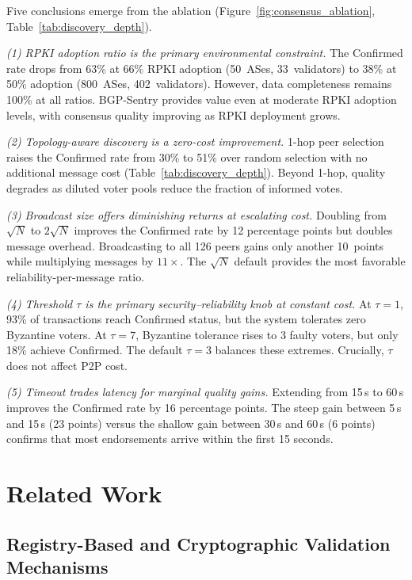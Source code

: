 \documentclass[conference]{IEEEtran}
\newcommand{\BfPara}[1]{\vspace{1mm}{\noindent\textbf{#1.}}\xspace}
\begin{document}
\BfPara{Key Findings}
Five conclusions emerge from the ablation (Figure~\ref{fig:consensus_ablation}, Table~\ref{tab:discovery_depth}).

\emph{(1) RPKI adoption ratio is the primary environmental constraint.} The Confirmed rate drops from 63\% at 66\% RPKI adoption (50~ASes, 33~validators) to 38\% at 50\% adoption (800~ASes, 402~validators). However, data completeness remains 100\% at all ratios. BGP-Sentry provides value even at moderate RPKI adoption levels, with consensus quality improving as RPKI deployment grows.

\emph{(2) Topology-aware discovery is a zero-cost improvement.} 1-hop peer selection raises the Confirmed rate from 30\% to 51\% over random selection with no additional message cost (Table~\ref{tab:discovery_depth}). Beyond 1-hop, quality degrades as diluted voter pools reduce the fraction of informed votes.

\emph{(3) Broadcast size offers diminishing returns at escalating cost.} Doubling from $\sqrt{N}$ to $2\sqrt{N}$ improves the Confirmed rate by 12 percentage points but doubles message overhead. Broadcasting to all 126 peers gains only another 10~points while multiplying messages by $11\times$. The $\sqrt{N}$ default provides the most favorable reliability-per-message ratio.

\emph{(4) Threshold $\tau$ is the primary security--reliability knob at constant cost.} At $\tau{=}1$, 93\% of transactions reach Confirmed status, but the system tolerates zero Byzantine voters. At $\tau{=}7$, Byzantine tolerance rises to 3 faulty voters, but only 18\% achieve Confirmed. The default $\tau{=}3$ balances these extremes. Crucially, $\tau$ does not affect P2P cost.

\emph{(5) Timeout trades latency for marginal quality gains.} Extending from 15\,s to 60\,s improves the Confirmed rate by 16 percentage points. The steep gain between 5\,s and 15\,s (23 points) versus the shallow gain between 30\,s and 60\,s (6 points) confirms that most endorsements arrive within the first 15 seconds.



%
\section{Related Work}
\label{sec:relatedWork}

\subsection{Registry-Based and Cryptographic Validation Mechanisms}
\end{document}
